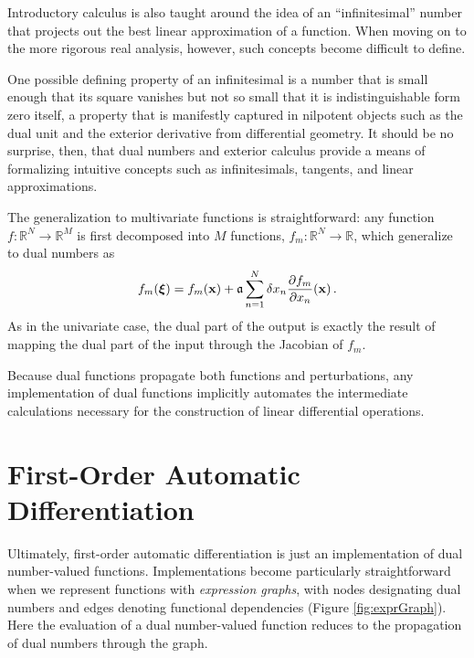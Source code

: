 \begin{tcolorbox}[colback=gray90,colframe=gray90, coltitle=black,
title=\textbf{Dual Numbers, Exterior Derivatives, and Infinitetesimals}]

Introductory calculus is also taught around the idea of an ``infinitesimal'' number that 
projects out the best linear approximation of a function.  When moving on to the more
rigorous real analysis, however, such concepts become difficult to define.

\parindent=15pt

One possible defining property of an infinitesimal is a number that is small enough that
its square vanishes but not so small that it is indistinguishable form zero itself, a property
that is manifestly captured in nilpotent objects such as the dual unit and the exterior
derivative from differential geometry.  It should be no surprise, then, that dual numbers
and exterior calculus provide a means of formalizing intuitive concepts such as
infinitesimals, tangents, and linear approximations.

\end{tcolorbox}

The generalization to multivariate functions is straightforward: any function 
$f : \mathbb{R}^{N} \rightarrow \mathbb{R}^{M}$ is first decomposed into $M$
functions, $f_{m} : \mathbb{R}^{N} \rightarrow \mathbb{R}$, which generalize
to dual numbers as
%
\begin{equation} \label{dualFunction}
f_{m} \! \left( \mbox{\boldmath{$\xi$}} \right) = f_{m} \! \left( \mathbf{x} \right) 
+ \mathfrak{a} \sum_{n = 1}^{N} 
\delta x_{n} \frac{ \partial f_{m} }{ \partial x_{n} } \! \left( \mathbf{x} \right).
\end{equation}
%
As in the univariate case, the dual part of the output is exactly the result of
mapping the dual part of the input through the Jacobian of $f_{m}$.  

Because dual functions propagate both functions and perturbations, any implementation
of dual functions implicitly automates the intermediate calculations necessary for the 
construction of linear differential operations.

\section{First-Order Automatic Differentiation}

Ultimately, first-order automatic differentiation is just an implementation of dual number-valued
functions.  Implementations become particularly straightforward when we represent functions
with \textit{expression graphs}, with nodes designating dual numbers and edges denoting
functional dependencies (Figure \ref{fig:exprGraph}).  Here the evaluation of a
dual number-valued function reduces to the propagation of dual numbers through the graph.

